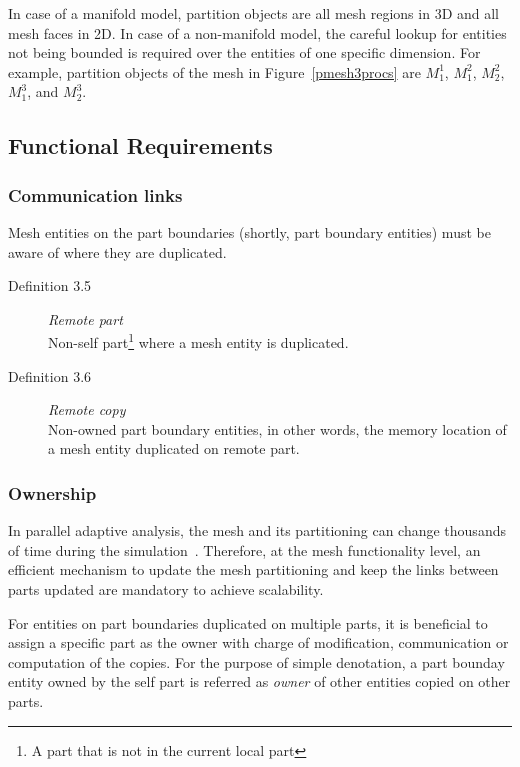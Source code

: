 In case of a manifold model, partition objects are all mesh
regions in 3D and all mesh faces in 2D. In case of a non-manifold model, the careful
lookup for entities not being bounded is required 
over the entities of one specific dimension. For example, partition objects of the mesh in Figure~\ref{pmesh3procs} are
$M^1_1$, $M^2_1$, $M^2_2$, $M^3_1$, and $M^3_2$. 

\subsection{Functional Requirements}\label{ch:distmesh:req} 

\subsubsection{Communication links}

Mesh entities on the part boundaries (shortly, part boundary entities) must be aware of where they are duplicated. 

\begin{description}
\item[Definition 3.5] \emph{Remote part}\\
Non-self part\footnote{A part that is not in the current local
part} where a mesh entity is duplicated.
\item[Definition 3.6] \emph{Remote copy}\\
Non-owned part boundary entities, in other words, the memory location of a mesh entity duplicated on remote part. 
\end{description}

\subsubsection{Ownership}

In parallel adaptive analysis, the mesh and its partitioning can change thousands of time
during the simulation~\cite{adapt06, deCougny-Shephard99, Oliker-etal00, Shep-etal97}. Therefore, at the mesh functionality 
level, an efficient mechanism to update the mesh partitioning and keep the links
between parts updated are mandatory to achieve scalability.

For entities on part boundaries duplicated on multiple parts, it is beneficial to
assign a specific part as the owner with charge of modification, communication or computation of the copies. For the purpose of simple denotation, a part bounday entity owned by the self part is referred as \emph{owner} of other entities copied on other parts.

